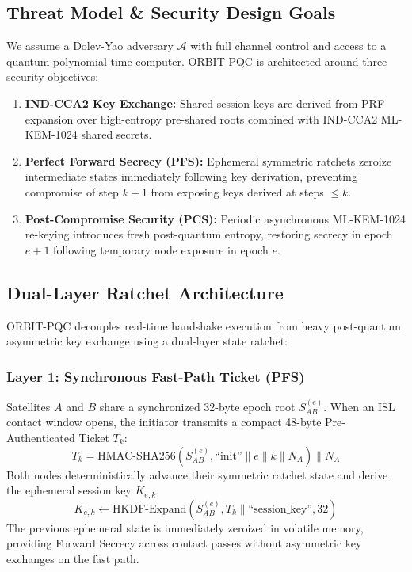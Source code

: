 \documentclass[lettersize,journal]{IEEEtran}
\begin{document}
\subsection{Threat Model \& Security Design Goals}
We assume a Dolev-Yao adversary $\mathcal{A}$ with full channel control and access to a quantum polynomial-time computer. ORBIT-PQC is architected around three security objectives:
\begin{enumerate}
    \item \textbf{IND-CCA2 Key Exchange:} Shared session keys are derived from PRF expansion over high-entropy pre-shared roots combined with IND-CCA2 ML-KEM-1024 shared secrets.
    \item \textbf{Perfect Forward Secrecy (PFS):} Ephemeral symmetric ratchets zeroize intermediate states immediately following key derivation, preventing compromise of step $k+1$ from exposing keys derived at steps $\le k$.
    \item \textbf{Post-Compromise Security (PCS):} Periodic asynchronous ML-KEM-1024 re-keying introduces fresh post-quantum entropy, restoring secrecy in epoch $e+1$ following temporary node exposure in epoch $e$.
\end{enumerate}

\subsection{Dual-Layer Ratchet Architecture}
ORBIT-PQC decouples real-time handshake execution from heavy post-quantum asymmetric key exchange using a dual-layer state ratchet:

\subsubsection{Layer 1: Synchronous Fast-Path Ticket (PFS)}
Satellites $A$ and $B$ share a synchronized 32-byte epoch root $S_{AB}^{(e)}$. When an ISL contact window opens, the initiator transmits a compact 48-byte Pre-Authenticated Ticket $T_k$:
\begin{equation}
T_k = \text{HMAC-SHA256}(S_{AB}^{(e)}, \text{``init''} \parallel e \parallel k \parallel N_A) \parallel N_A
\end{equation}
Both nodes deterministically advance their symmetric ratchet state and derive the ephemeral session key $K_{e, k}$:
\begin{equation}
K_{e, k} \leftarrow \text{HKDF-Expand}(S_{AB}^{(e)}, T_k \parallel \text{``session\_key''}, 32)
\end{equation}
The previous ephemeral state is immediately zeroized in volatile memory, providing Forward Secrecy across contact passes without asymmetric key exchanges on the fast path.
\end{document}
